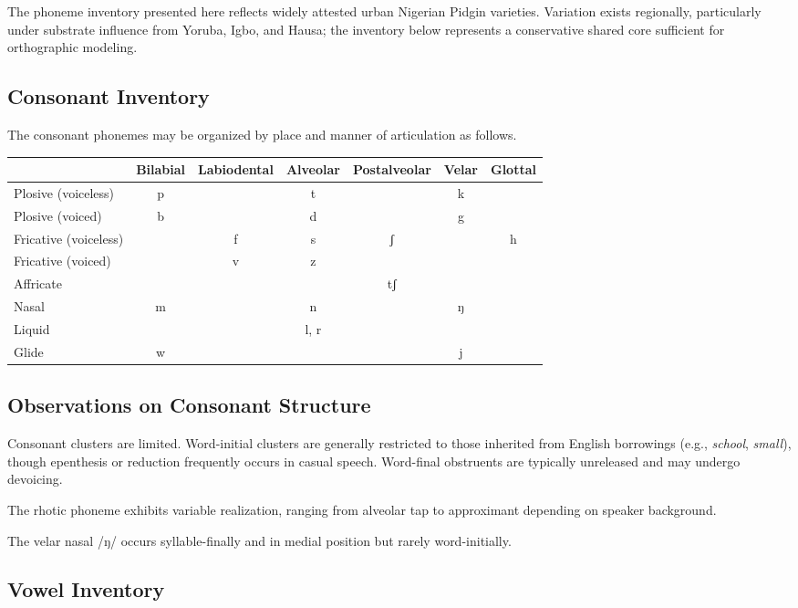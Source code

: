 \documentclass[12pt]{article}
\begin{document}
The phoneme inventory presented here reflects widely attested urban Nigerian Pidgin varieties. Variation exists regionally, particularly under substrate influence from Yoruba, Igbo, and Hausa; the inventory below represents a conservative shared core sufficient for orthographic modeling.

\subsection{Consonant Inventory}

The consonant phonemes may be organized by place and manner of articulation as follows.

\begin{center}
\begin{tabular}{lcccccc}
 & Bilabial & Labiodental & Alveolar & Postalveolar & Velar & Glottal \\ \hline
Plosive (voiceless) & p &  & t &  & k &  \\
Plosive (voiced) & b &  & d &  & g &  \\
Fricative (voiceless) &  & f & s & ʃ &  & h \\
Fricative (voiced) &  & v & z &  &  &  \\
Affricate &  &  &  & tʃ &  &  \\
Nasal & m &  & n &  & ŋ &  \\
Liquid &  &  & l, r &  &  &  \\
Glide & w &  &  &  & j &  \\
\end{tabular}
\end{center}

\subsection{Observations on Consonant Structure}

Consonant clusters are limited. Word-initial clusters are generally restricted to those inherited from English borrowings (e.g., \textit{school}, \textit{small}), though epenthesis or reduction frequently occurs in casual speech. Word-final obstruents are typically unreleased and may undergo devoicing.

The rhotic phoneme exhibits variable realization, ranging from alveolar tap to approximant depending on speaker background.

The velar nasal /ŋ/ occurs syllable-finally and in medial position but rarely word-initially.

\subsection{Vowel Inventory}
\end{document}
